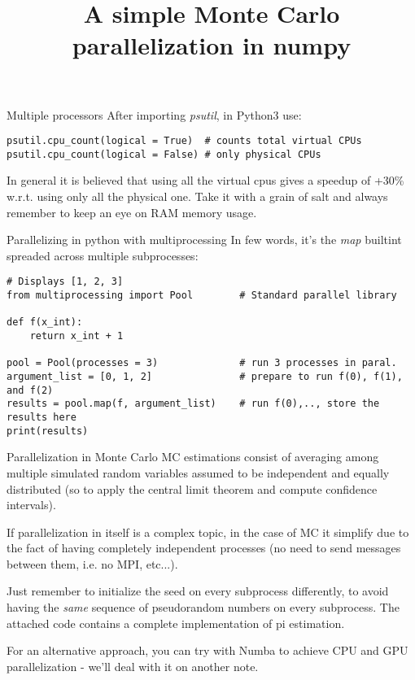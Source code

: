 \documentclass[10pt]{article}
\title {A simple Monte Carlo parallelization in numpy}
\begin{document}
\maketitle

\begin{section}{Multiple processors}
After importing \emph{psutil}, in Python3 use:
\begin{lstlisting}
psutil.cpu_count(logical = True)  # counts total virtual CPUs
psutil.cpu_count(logical = False) # only physical CPUs
\end{lstlisting}

In general it is believed that using all the virtual cpus gives a speedup
of +30\% w.r.t. using only all the physical one. Take it with a grain of salt
and always remember to keep an eye on RAM memory usage.
\end{section}


\begin{section}{Parallelizing in python with multiprocessing}
In few words, it's the \emph{map} builtint spreaded across
multiple subprocesses:
\begin{lstlisting}
# Displays [1, 2, 3]
from multiprocessing import Pool        # Standard parallel library

def f(x_int):
    return x_int + 1

pool = Pool(processes = 3)              # run 3 processes in paral.
argument_list = [0, 1, 2]               # prepare to run f(0), f(1), and f(2)
results = pool.map(f, argument_list)    # run f(0),.., store the results here
print(results)
\end{lstlisting}

\end{section}


\begin{section}{Parallelization in Monte Carlo}
MC estimations consist of averaging among
multiple simulated random variables assumed to be 
independent and equally distributed (so to apply the central limit theorem
and compute confidence intervals).

If parallelization in itself is a complex topic, in the case
of MC it simplify due to the fact of having
completely independent processes (no need to send messages between them,
i.e. no MPI, etc...).

Just remember to initialize the seed on every subprocess differently,
to avoid having the \emph{same} sequence of pseudorandom numbers 
on every subprocess.
The attached code contains a complete implementation of pi estimation.


For an alternative approach, you can try with Numba to achieve CPU
and GPU parallelization - we'll deal with it on another note.
\end{section}
\end{document}
